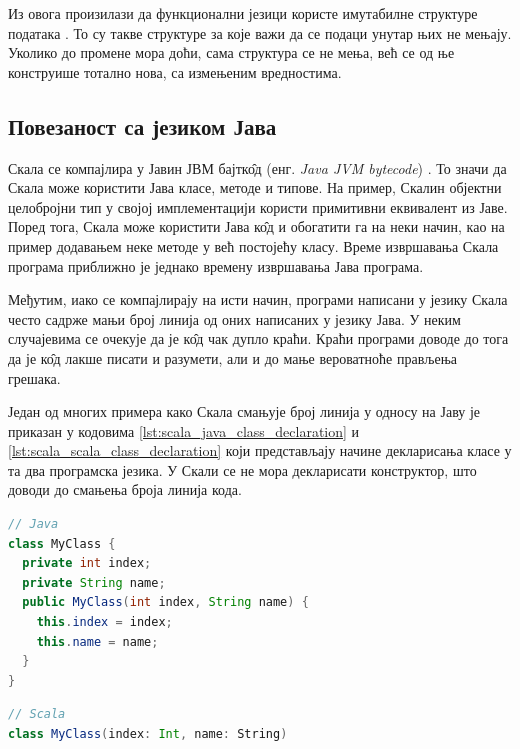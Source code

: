 \documentclass[12pt,oneside]{memoir}
\begin{document}
Из овога произилази да функционални језици користе имутабилне структуре података \cite{scala_prog}. То су такве структуре за које важи да се подаци унутар њих не мењају. Уколико до промене мора доћи, сама структура се не мења, већ се од ње конструише тотално нова, са измењеним вредностима.


\subsection{Повезаност са језиком Јава}
\label{subsec:scala_komp}

Скала се компајлира у Јавин ЈВМ бајтк\^{о}д (енг. \textit{Java JVM bytecode}) \cite{scala_prog}. То значи да Скала може користити Јава класе, методе и типове. На пример, Скалин објектни целобројни тип у својој имплементацији користи примитивни еквивалент из Јаве. Поред тога, Скала може користити Јава к\^{о}д и обогатити га на неки начин, као на пример додавањем неке методе у већ постојећу класу. Време извршавања Скала програма приближно је једнако времену извршавања Јава програма.

Међутим, иако се компајлирају на исти начин, програми написани у језику Скала често садрже мањи број линија од оних написаних у језику Јава. У неким случајевима се очекује да је к\^{о}д чак дупло краћи. Краћи програми доводе до тога да је к\^{о}д лакше писати и разумети, али и до мање вероватноће прављења грешака.

Један од многих примера како Скала смањује број линија у односу на Јаву је приказан у кодовима \ref{lst:scala_java_class_declaration} и \ref{lst:scala_scala_class_declaration} који представљају начине декларисања класе у та два програмска језика. У Скали се не мора декларисати конструктор, што доводи до смањења броја линија кода.

\begin{lstlisting}[caption={Декларација класе у језику Јава}, language=Java, label={lst:scala_java_class_declaration}]
// Java
class MyClass {  
  private int index;
  private String name;
  public MyClass(int index, String name) {
    this.index = index;
    this.name = name;
  }
}
\end{lstlisting}

\begin{lstlisting}[caption={Декларација класе у језику Скала}, language=Scala, label={lst:scala_scala_class_declaration}]
// Scala
class MyClass(index: Int, name: String)

\end{lstlisting}
\end{document}
